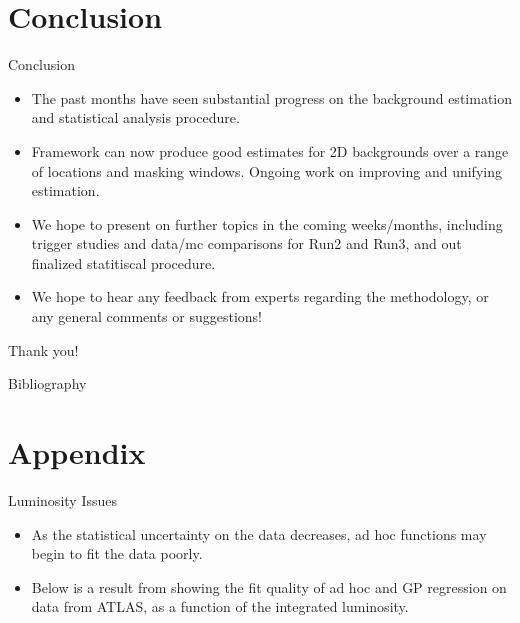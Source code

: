\documentclass[10pt]{beamer}
\begin{document}
\section{Conclusion}
\label{sec:conclusion}


\begin{frame}{Conclusion}
  \begin{itemize}
  \item The past months have seen substantial progress on the background estimation and statistical analysis procedure.
  \item Framework can now produce good estimates for 2D backgrounds over a range of locations and masking windows. Ongoing work on improving and unifying estimation. 
  \item We hope to present on further topics in the coming weeks/months, including trigger studies and data/mc comparisons for Run2 and Run3, and out finalized statitiscal procedure.
  \item We hope to hear any feedback from experts regarding the methodology, or any general comments or suggestions!
  \end{itemize}
  \vspace{1cm}

  \begin{center}
    {\Large Thank you!}
  \end{center}
\end{frame}

\begin{frame}[allowframebreaks]{Bibliography}
  
  
\end{frame}


\appendix

\section{Appendix}
\label{sec:appendix}


\begin{frame}{Luminosity Issues}
  \begin{itemize}
  \item As the statistical uncertainty on the data decreases, ad hoc functions may begin to fit the data poorly. 
  \item Below is a result from \cite{frate_modeling_2017} showing the fit quality of ad hoc and GP regression on data from ATLAS, as a function of the integrated luminosity.
  \end{itemize}
  \begin{center}
  \end{center}
\end{frame}
\end{document}
